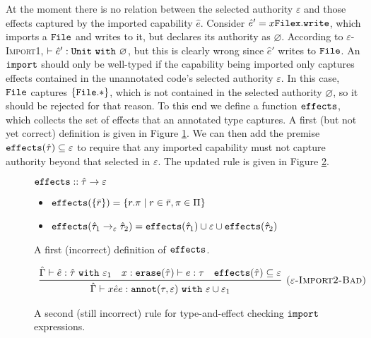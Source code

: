 At the moment there is no relation between the selected authority $\varepsilon$ and those effects captured by the imported capability $\hat e$. Consider $\hat e' = {x}{\mathtt{File}}{\mathtt{x.write}}$, which imports a $\mathtt{File}$ and writes to it, but declares its authority as $\varnothing$. According to \textsc{$\varepsilon$-Import1}, $\vdash \hat e': \mathtt{Unit}~\mathtt{with}~ \varnothing$, but this is clearly wrong since $\hat e'$ writes to $\mathtt{File}$.
An $\mathtt{import}$ should only be well-typed if the capability being imported only captures effects contained in the unannotated code's selected authority $\varepsilon$. In this case, $\mathtt{File}$ captures $\mathtt{ \{ File.* \}}$, which is not contained in the selected authority $\varnothing$, so it should be rejected for that reason.
To this end we define a function $\mathtt{effects}$, which collects the set of effects that an annotated type captures. A first (but not yet correct) definition is given in Figure \ref{fig:fx_defn}. We can then add the premise $\mathtt{effects}(\hat \tau) \subseteq \varepsilon$ to require that any imported capability must not capture authority beyond that selected in $\varepsilon$. The updated rule is given in Figure \ref{fig:import_rule_2}.

\begin{figure}[h]

$\mathtt{effects} :: \hat \tau \rightarrow \varepsilon$
\begin{itemize}
	\setlength\itemsep{-0.2em}
	\item[] $\mathtt{effects}(\{ \bar r \}) = \{ r.\pi \mid r \in \bar r, \pi \in \Pi \}$
	\item[] $\mathtt{effects}(\hat \tau_1 \rightarrow_{\varepsilon} \hat \tau_2) = \mathtt{effects}(\hat \tau_1) \cup \varepsilon \cup \mathtt{effects}(\hat \tau_2)$
\end{itemize}
\vspace{-7pt}
\caption{A first (incorrect) definition of $\mathtt{effects}$.}
\label{fig:fx_defn}
\end{figure}

\begin{figure}[h]

\[
\begin{array}{c}

\infer[\textsc{($\varepsilon$-Import2-Bad)}]
	{ \hat \Gamma \vdash {x}{\hat e}{e}: \kwa{annot}(\tau, \varepsilon)~\kw{with} \varepsilon \cup \varepsilon_1 }
	{ \hat \Gamma \vdash \hat e: \hat \tau~\kw{with} \varepsilon_1 & x: \kwa{erase}(\hat \tau) \vdash e: \tau & \kwa{effects}(\hat \tau) \subseteq \varepsilon}

\end{array}
\]
\vspace{-7pt}
\caption{A second (still incorrect) rule for type-and-effect checking $\mathtt{import}$ expressions.}
\label{fig:import_rule_2}
\end{figure}

